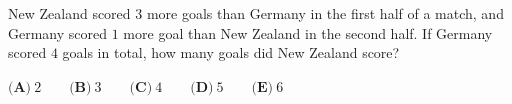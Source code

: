 New Zealand scored $3$ more goals than Germany in the first half of a match, and Germany scored $1$ more goal than New Zealand in the second half. If Germany scored $4$ goals in total, how many goals did New Zealand score?

$\textbf{(A)}\ 2\qquad\textbf{(B)}\ 3\qquad\textbf{(C)}\ 4\qquad\textbf{(D)}\ 5\qquad\textbf{(E)}\ 6$
